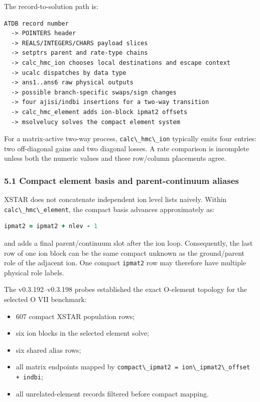 \documentclass[
  10pt,
]{article}
\newcommand{\passthrough}[1]{#1}
\providecommand{\tightlist}{%
  \setlength{\itemsep}{0pt}\setlength{\parskip}{0pt}}
\begin{document}
The record-to-solution path is:

\begin{lstlisting}
ATDB record number
  -> POINTERS header
  -> REALS/INTEGERS/CHARS payload slices
  -> setptrs parent and rate-type chains
  -> calc_hmc_ion chooses local destinations and escape context
  -> ucalc dispatches by data type
  -> ans1..ans6 raw physical outputs
  -> possible branch-specific swaps/sign changes
  -> four ajisi/indbi insertions for a two-way transition
  -> calc_hmc_element adds ion-block ipmat2 offsets
  -> msolvelucy solves the compact element system
\end{lstlisting}

For a matrix-active two-way process,
\passthrough{\lstinline!calc\_hmc\_ion!} typically emits four entries:
two off-diagonal gains and two diagonal losses. A rate comparison is
incomplete unless both the numeric values and these row/column
placements agree.

\subsubsection{5.1 Compact element basis and parent-continuum
aliases}\label{compact-element-basis-and-parent-continuum-aliases}

XSTAR does not concatenate independent ion level lists naively. Within
\passthrough{\lstinline!calc\_hmc\_element!}, the compact basis advances
approximately as:

\begin{lstlisting}[language=Fortran]
ipmat2 = ipmat2 + nlev - 1
\end{lstlisting}

and adds a final parent/continuum slot after the ion loop. Consequently,
the last row of one ion block can be the same compact unknown as the
ground/parent role of the adjacent ion. One compact
\passthrough{\lstinline!ipmat2!} row may therefore have multiple
physical role labels.

The v0.3.192--v0.3.198 probes established the exact O-element topology
for the selected O VII benchmark:

\begin{itemize}
\tightlist
\item
  607 compact XSTAR population rows;
\item
  six ion blocks in the selected element solve;
\item
  six shared alias rows;
\item
  all matrix endpoints mapped by
  \passthrough{\lstinline!compact\_ipmat2 = ion\_ipmat2\_offset + indbi!};
\item
  all unrelated-element records filtered before compact mapping.
\end{itemize}
\end{document}

